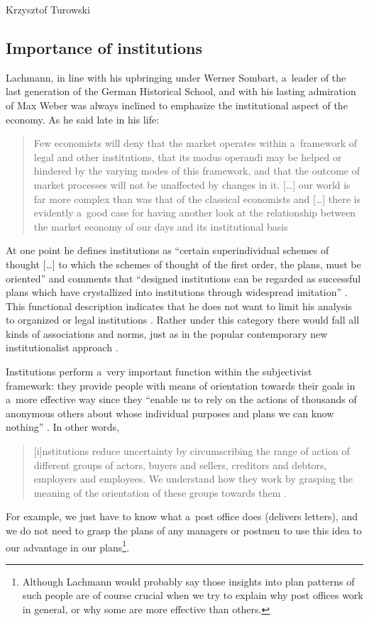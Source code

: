 \begin{artengenv}{Krzysztof Turowski}
\subsection{Importance of institutions}


Lachmann, in line with his upbringing under Werner Sombart, a~leader of the last generation of the German Historical School, and with his lasting admiration of Max Weber was always inclined to emphasize the institutional aspect of the economy. As he said late in his life:
\begin{quote}
Few economists will deny that the market operates within a~framework of legal and other institutions, that its modus operandi may be helped or hindered by the varying modes of this framework, and that the outcome of market processes will not be unaffected by changes in it. [\ldots] our world is far more complex than was that of the classical economists and [\ldots] there is evidently a~good case for having another look at the relationship between the market economy of our days and its institutional basis \parencite[249--250]{lachmann-legislation}
\end{quote}
At one point he defines institutions as ``certain superindividual schemes of thought [\ldots] to which the schemes of thought of the first order, the plans, must be oriented'' \parencite[62]{lachmann-significance} and comments that ``designed institutions can be regarded as successful plans which have crystallized into institutions through widespread imitation'' \parencite[81, 89]{lachmann-mises-process}.
This functional description indicates that he does not want to limit his analysis to organized or legal institutions \parencite[62--63]{lachmann-weber}. Rather under this category there would fall all kinds of associations and norms, just as in the popular contemporary new institutionalist approach \parencite[7--8]{alvesson}.

Institutions perform a~very important function within the subjectivist framework: they provide people with means of orientation towards their goals in a~more effective way since they ``enable us to rely on the actions of thousands of anonymous others about whose individual purposes and plans we can know nothing'' \parencite[49--50]{lachmann-weber}. In other words,
\begin{quote}
[i]nstitutions reduce uncertainty by circumscribing the range of action of different groups of actors, buyers and sellers, creditors and debtors, employers and employees. We understand how they work by grasping the meaning of the orientation of these groups towards them \parencite[277]{lachmann-hermeneutic}.
\end{quote}
For example, we just have to know what a~post office does (delivers letters), and we do not need to grasp the plans of any managers or postmen to use this idea to our advantage in our plans\footnote{Although Lachmann would probably say those insights into plan patterns of such people are of course crucial when we try to explain why post offices work in general, or why some are more effective than others.}.


\end{artengenv}
